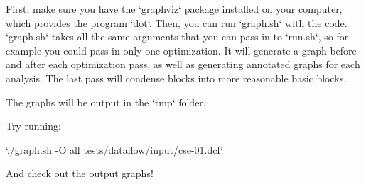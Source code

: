 \documentclass[11pt]{article}
\begin{document}
   First, make sure you have the `graphviz` package installed on your computer, which provides the program
   `dot`. Then, you can run `graph.sh` with the code. `graph.sh` takes all the same arguments that you can
   pass in to `run.sh`, so for example you could pass in only one optimization. It will generate a graph
   before and after each optimization pass, as well as generating annotated graphs for each analysis. 
   The last pass will condense blocks into more reasonable basic blocks.

   The graphs will be output in the `tmp` folder. 

   Try running:

   `./graph.sh -O all tests/dataflow/input/cse-01.dcf`

   And check out the output graphs!
\end{document}
